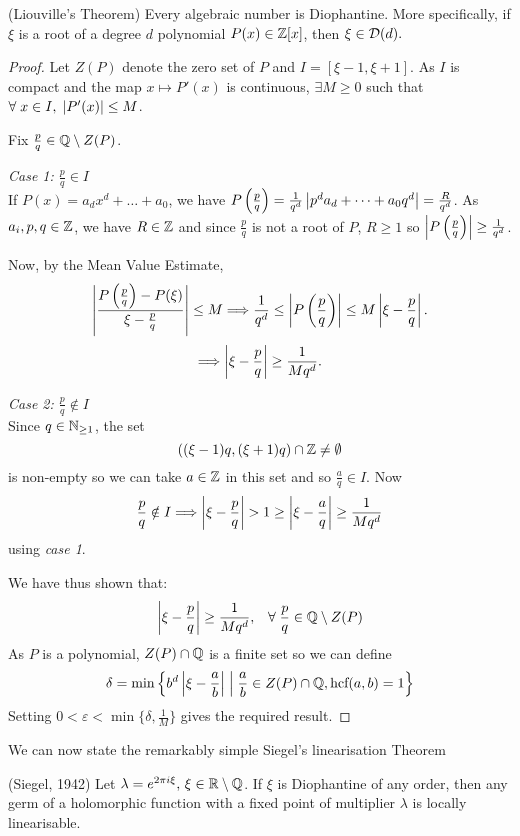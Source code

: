 \documentclass[../main.tex]{subfiles}
\begin{document}
\begin{thm}
(Liouville's Theorem) Every algebraic number is Diophantine. More specifically, if $\xi$ is a root of a degree $d$ polynomial $P(x) \in \mathbb{Z}[x]$, then $\xi \in \mathcal{D}(d).$
\end{thm}
\begin{proof}

Let $Z(P)$ denote the zero set of $P$ and $I = [\xi - 1, \xi + 1]$. As $I$ is compact and the map $x \mapsto P'(x)$ is continuous, $\exists M \geq 0$ such that $\forall \; x\in I,\; \left|P'(x)\right| \leq M$.

Fix $\frac{p}{q} \in \mathbb{Q}\setminus Z(P)$.

\textit{Case 1: $\frac{p}{q} \in I$}\\
If $P(x) = a_dx^d + \dots + a_0$, we have $P\left(\frac{p}{q}\right) = \frac{1}{q^d}\left|p^da_d + \dots + a_0q^d\right| = \frac{R}{q^d}$. As $a_i, p, q \in \mathbb{Z}$, we have $R \in \mathbb{Z}$ and since $\frac{p}{q}$ is not a root of $P$, $R \geq 1$ so $\left|P\left(\frac{p}{q}\right)\right| \geq \frac{1}{q^d}$. 

Now, by the Mean Value Estimate, 
\[
\left|\frac{P\left(\frac{p}{q}\right) - P(\xi)}{\xi - \frac{p}{q}}\right| \leq M \Longrightarrow \frac{1}{q^d} \leq \left|P\left(\frac{p}{q}\right)\right| \leq M\left|\xi - \frac{p}{q}\right|.
\]
\[
\Longrightarrow \left|\xi - \frac{p}{q}\right| \geq \frac{1}{Mq^d}.
\]

\textit{Case 2: $\frac{p}{q} \notin I$}\\
Since $q \in \mathbb{N}_{\geq 1}$, the set
\[
((\xi - 1)q, (\xi + 1)q) \cap \mathbb{Z} \neq \emptyset
\]
is non-empty so we can take $a \in \mathbb{Z}$ in this set and so $\frac{a}{q} \in I$. Now
\[
\frac{p}{q} \notin I \Longrightarrow \left|\xi - \frac{p}{q}\right| > 1 \geq \left|\xi - \frac{a}{q}\right| \geq \frac{1}{Mq^d}
\]
using \textit{case 1}.

We have thus shown that:
\[
\left|\xi - \frac{p}{q}\right| \geq \frac{1}{Mq^d}, \;\;\; \forall\; \frac{p}{q} \in \mathbb{Q}\setminus Z(P)
\]
As $P$ is a polynomial, $Z(P) \cap \mathbb{Q}$ is a finite set so we can define 
\[
\delta = \min{\left\{b^{d}\ensuremath{\left|\xi - \frac{a}{b}\right|} \mathrel{\Big|} \frac{a}{b} \in Z(P) \cap \ensuremath{\mathbb{Q}}, \text{hcf}(a, b) = 1 \right\}}
\]
Setting $0 < \varepsilon < \min\{\delta, \frac{1}{M}\}$ gives the required result.
\end{proof}

We can now state the remarkably simple Siegel's linearisation Theorem
\begin{thm}(Siegel, 1942) \label{thm: 11.4}
Let $\lambda = e^{2\pi i \xi},\, \xi \in \mathbb{R}\setminus\mathbb{Q}$. If $\xi$ is Diophantine of any order, then any germ of a holomorphic function with a fixed point of multiplier $\lambda$ is locally linearisable.
\end{thm}
\end{document}

